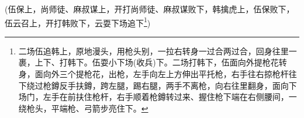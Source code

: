 {(伍保{\hwfs 上}，尚师徒、麻叔谋{\hwfs 上}，{\hwfs 开打}尚师徒、麻叔谋{\hwfs 败下}，韩擒虎{\hwfs 上}，伍保{\hwfs 败下}，伍云召{\hwfs 上}，{\hwfs 开打}韩败{\hwfs 下}，云{\hwfs 耍下场追下}\footnote{{\hwfs 二场}伍{\hwfs 追}韩{\hwfs 上}，{\hwl 原地漫头}，{\hwl 用枪头别}，{\hwl 一拉右转身一过合两过合}，{\hwl 回身往里一裹}，{\hwl 上下}、{\hwl 打}韩{\hwfs 下}。伍{\hwl 耍小下场}({\hwfs 收兵}){\hwl 下}。{\hwfs 二场打}韩{\hwfs 下}，伍{\hwl 面向外提枪花转身}，{\hwl 面向外三个提枪花}，{\hwl 出枪}，{\hwl 左手向左上方伸出平托枪}，{\hwl 右手往右掠枪杆往下绕过枪鐏反手扶鐏}，{\hwl 跨左腿}，{\hwl 踢右腿}，{\hwl 两手不离枪}，{\hwl 向右往里翻身}，{\hwl 面向下场门}，{\hwfs 左手在前扶住枪杆}，{\hwl 右手顺着枪鐏转过来}、{\hwl 握住枪下端在右侧腰间}，{\hwl 一绕枪头}，{\hwl 平端枪}、{\hwl 弓箭步亮住下}。})

\vspace{5pt}




\vspace{5pt}




\vspace{5pt}



}
